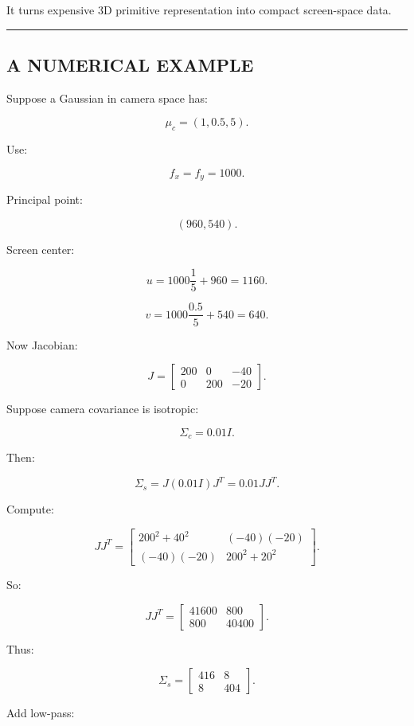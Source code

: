 It turns expensive 3D primitive representation into compact screen-space data.

\begin{center}\rule{0.5\linewidth}{0.5pt}\end{center}

\subsection{A NUMERICAL EXAMPLE}\label{04-visual-computing-ii-ch038-a-numerical-example}

Suppose a Gaussian in camera space has:

\[
\mu_c=
(1,0.5,5).
\]

Use:

\[
f_x=f_y=1000.
\]

Principal point:

\[
(960,540).
\]

Screen center:

\[
u=
1000\frac15+960
=
1160.
\]

\[
v=
1000\frac{0.5}{5}+540
=
640.
\]

Now Jacobian:

\[
J=
\begin{bmatrix}
200&0&-40\\
0&200&-20
\end{bmatrix}.
\]

Suppose camera covariance is isotropic:

\[
\Sigma_c=
0.01I.
\]

Then:

\[
\Sigma_s=
J(0.01I)J^T
=
0.01JJ^T.
\]

Compute:

\[
JJ^T
=
\begin{bmatrix}
200^2+40^2
&
(-40)(-20)
\\
(-40)(-20)
&
200^2+20^2
\end{bmatrix}.
\]

So:

\[
JJ^T=
\begin{bmatrix}
41600&800\\
800&40400
\end{bmatrix}.
\]

Thus:

\[
\Sigma_s=
\begin{bmatrix}
416&8\\
8&404
\end{bmatrix}.
\]

Add low-pass:

